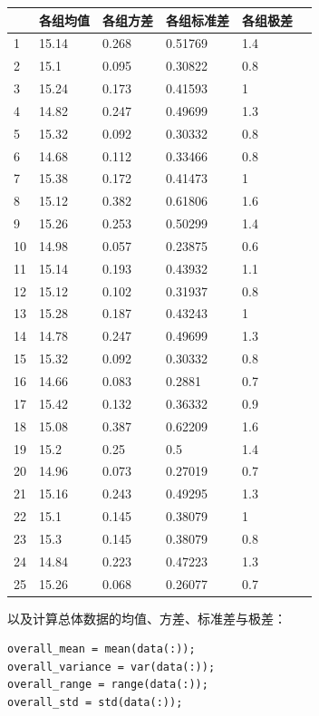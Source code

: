 \documentclass[12pt]{article}  %
\begin{document}
\begin{longtable}[]{@{}llllll@{}}
	\toprule\noalign{}
	& 各组均值 & 各组方差 & 各组标准差 & 各组极差 \\
	\midrule\noalign{}
	\endhead
	\bottomrule\noalign{}
	\endlastfoot

	1 & 15.14 & 0.268 & 0.51769 & 1.4 \\
	2 & 15.1 & 0.095 & 0.30822 & 0.8 \\
	3 & 15.24 & 0.173 & 0.41593 & 1 \\
	4 & 14.82 & 0.247 & 0.49699 & 1.3 \\
	5 & 15.32 & 0.092 & 0.30332 & 0.8 \\
	6 & 14.68 & 0.112 & 0.33466 & 0.8 \\
	7 & 15.38 & 0.172 & 0.41473 & 1 \\
	8 & 15.12 & 0.382 & 0.61806 & 1.6 \\
	9 & 15.26 & 0.253 & 0.50299 & 1.4 \\
	10 & 14.98 & 0.057 & 0.23875 & 0.6 \\
	11 & 15.14 & 0.193 & 0.43932 & 1.1 \\
	12 & 15.12 & 0.102 & 0.31937 & 0.8 \\
	13 & 15.28 & 0.187 & 0.43243 & 1 \\
	14 & 14.78 & 0.247 & 0.49699 & 1.3 \\
	15 & 15.32 & 0.092 & 0.30332 & 0.8 \\
	16 & 14.66 & 0.083 & 0.2881 & 0.7 \\
	17 & 15.42 & 0.132 & 0.36332 & 0.9 \\
	18 & 15.08 & 0.387 & 0.62209 & 1.6 \\
	19 & 15.2 & 0.25 & 0.5 & 1.4 \\
	20 & 14.96 & 0.073 & 0.27019 & 0.7 \\
	21 & 15.16 & 0.243 & 0.49295 & 1.3 \\
	22 & 15.1 & 0.145 & 0.38079 & 1 \\
	23 & 15.3 & 0.145 & 0.38079 & 0.8 \\
	24 & 14.84 & 0.223 & 0.47223 & 1.3 \\
	25 & 15.26 & 0.068 & 0.26077 & 0.7 \\
\end{longtable}

以及计算总体数据的均值、方差、标准差与极差：
\begin{lstlisting}
overall_mean = mean(data(:)); 
overall_variance = var(data(:)); 
overall_range = range(data(:)); 
overall_std = std(data(:));
\end{lstlisting}
\end{document}

